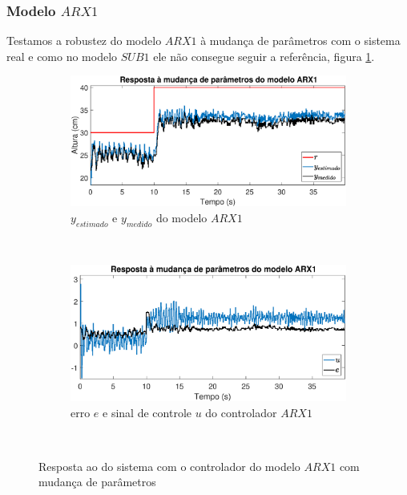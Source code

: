 \subsubsection{Modelo $ARX1$}
Testamos a robustez do modelo $ARX1$ à mudança de parâmetros com o sistema real e como no modelo $SUB1$ ele não consegue seguir a referência, figura \ref{fig:mprarx1y}.
\begin{figure}[htb]
	\centering
	\begin{subfigure}[t]{0.48\textwidth}
		\includegraphics[width=1\linewidth]{mprarx1y}
		\caption[$y_{estimado}$ e $y_{medido}$ do modelo $ARX1$]{$y_{estimado}$ e $y_{medido}$ do modelo $ARX1$}
		\label{fig:mprarx1y}
	\end{subfigure}
	~ %
	\begin{subfigure}[t]{0.48\textwidth}
		\includegraphics[width=1\linewidth]{mprarx1e}
		\caption[erro $e$ e sinal de controle $u$ do controlador $ARX1$]{erro $e$ e sinal de controle $u$ do controlador $ARX1$}
		\label{fig:mprarx1e}
	\end{subfigure}
	~ %
	
	\caption{Resposta ao do sistema com o controlador do modelo $ARX1$ com mudança de parâmetros}\label{fig:mprarx1}
\end{figure}

